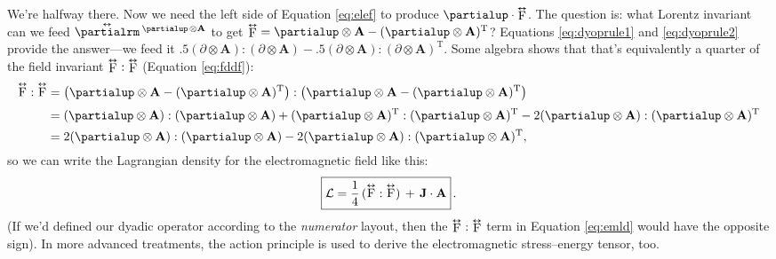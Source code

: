 \documentclass[12pt]{article}
\renewcommand{\vv}[1]{\mathbf{#1}}
\newcommand{\tightoverset}[2]{%
  \mathop{#2}\limits^{\vbox to -.5ex{\kern-0.75ex\hbox{$#1$}\vss}}}
\newcommand{\inlinedy}[1]{\tightoverset{\text{\tiny$\bm\leftrightarrow$}}{#1}}
\newcommand{\capdy}[1]{ \overset{ \text{\tiny$\bm\leftrightarrow$} }{\vphantom{\text{\small{A}}}\smash{#1}} }
\begin{document}
We're halfway there. Now we need the left side of Equation \ref{eq:elef} to produce $\partialup \cdot \inlinedy{\mathrm{F}}$. The question is: what Lorentz invariant can we feed $\inlinedy{\partialrm} {}^{\partialup \mkern2mu \otimes \vv A}$ to get $\inlinedy{\mathrm{F}} = \partialup \otimes \vv A - (\partialup \otimes \vv A)^\mathrm{T}$? Equations \ref{eq:dyoprule1} and \ref{eq:dyoprule2} provide the answer---we feed it $.5(\partialup \otimes \vv A):(\partialup \otimes \vv A) - .5(\partialup \otimes \vv A):(\partialup \otimes \vv A)^\mathrm{T}$. Some algebra shows that that's equivalently a quarter of the field invariant $\inlinedy{\mathrm{F}} : \inlinedy{\mathrm{F}}$ (Equation \ref{eq:fddf}):
\begin{equation*}
\begin{aligned}
\capdy{\mathrm{F}} : \capdy{\mathrm{F}} &= \left( \partialup \otimes \vv A - (\partialup \otimes \vv A)^\mathrm{T} \right) : \left( \partialup \otimes \vv A - (\partialup \otimes \vv A)^\mathrm{T} \right) \\[2pt]
&= (\partialup \otimes \vv A):(\partialup \otimes \vv A) + (\partialup \otimes \vv A)^\mathrm{T} : (\partialup \otimes \vv A)^\mathrm{T}  - 2 (\partialup \otimes \vv A):(\partialup \otimes \vv A)^\mathrm{T} \\[2pt]
&= 2 (\partialup \otimes \vv A):(\partialup \otimes \vv A) - 2 (\partialup \otimes \vv A):(\partialup \otimes \vv A)^\mathrm{T},
\end{aligned}
\end{equation*}
so we can write the Lagrangian density for the electromagnetic field like this:
\begin{equation}\label{eq:emld}
\boxed{\mathcal{L} = \dfrac{1}{4} \, ( \capdy{\mathrm{F}} : \capdy{\mathrm{F}} ) \, + \, \vv J \cdot \vv A} \, .
\end{equation}
(If we'd defined our dyadic operator according to the \emph{numerator} layout, then the $\inlinedy{\mathrm{F}} : \inlinedy{\mathrm{F}}$ term in Equation \ref{eq:emld} would have the opposite sign). In more advanced treatments, the action principle is used to derive the electromagnetic stress--energy tensor, too.
\end{document}
